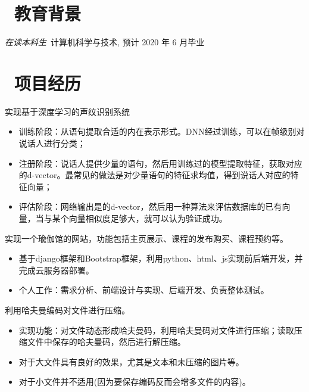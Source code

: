 \documentclass{resume}
\begin{document}


 
\section{\faGraduationCap\  教育背景}
\textit{在读本科生}\ 计算机科学与技术, 预计 2020 年 6 月毕业

\section{\faUsers\ 项目经历}

\begin{onehalfspacing}
实现基于深度学习的声纹识别系统
\begin{itemize}
  \item 训练阶段：从语句提取合适的内在表示形式。DNN经过训练，可以在帧级别对说话人进行分类；
  \item 注册阶段：说话人提供少量的语句，然后用训练过的模型提取特征，获取对应的d-vector。最常见的做法是对少量语句的特征求均值，得到说话人对应的特征向量；
  \item 评估阶段：网络输出是的d-vector，然后用一种算法来评估数据库的已有向量，当与某个向量相似度足够大，就可以认为验证成功。
\end{itemize}
\end{onehalfspacing}

\begin{onehalfspacing}
实现一个瑜伽馆的网站，功能包括主页展示、课程的发布购买、课程预约等。
\begin{itemize}
  \item 基于django框架和Bootstrap框架，利用python、html、js实现前后端开发，并完成云服务器部署。
  \item 个人工作：需求分析、前端设计与实现、后端开发、负责整体测试。
\end{itemize}
\end{onehalfspacing}

\begin{onehalfspacing}
利用哈夫曼编码对文件进行压缩。
\begin{itemize}
  \item 实现功能：对文件动态形成哈夫曼码，利用哈夫曼码对文件进行压缩；读取压缩文件中保存的哈夫曼码，然后进行解压缩。
  \item 对于大文件具有良好的效果，尤其是文本和未压缩的图片等。
  \item 对于小文件并不适用(因为要保存编码反而会增多文件的内容)。
\end{itemize}
\end{onehalfspacing}
\end{document}
